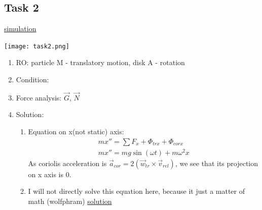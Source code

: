 \subsection*{Task 2}

\href{https://github.com/lvjonok/f22-theoretical-mechanics/blob/master/homework5/task2.gif}{simulation}

\texttt{[image: task2.png]}

\begin{enumerate}
    \item RO: particle M - translatory motion, disk A - rotation
    \item Condition:
          \begin{center}
          \end{center}
    \item Force analysis: $\vec{G}$, $\vec{N}$
    \item Solution:
          \begin{enumerate}
              \item Equation on x(not static) axis:
                    \begin{align}
                        mx'' = \sum F_x + \Phi_{tr x} + \Phi_{cor x} \\
                        mx'' = mg \sin(\omega t) + m \omega^2 x
                    \end{align}
                    As coriolis acceleration is $\vec{a}_{cor} = 2 (\vec{w}_{tr} \times \vec{v}_{rel})$,
                    we see that its projection on x axis is $0$.
              \item I will not directly solve this equation here,
                    because it just a matter of math (wolfphram)
                    \href{https://www.wolframalpha.com/input?i=y%28t%29%27%27+%3D+g+sin%28wt%29+%2B+w%5E2+y%28t%29%2C+y%280%29%3D0%2C+y%27%280%29%3D0.4}{solution}


\end{enumerate}
\end{enumerate}
